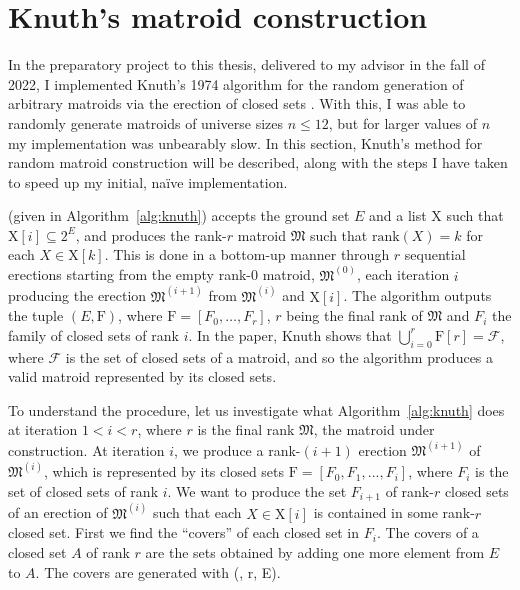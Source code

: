 \section{Knuth's matroid construction}
\label{sec:kmc}
In the preparatory project to this thesis, delivered to my advisor in the fall of 2022, I implemented Knuth's 1974 algorithm for the random generation of arbitrary matroids via the erection of closed sets \cite{knuth-1975}. With this, I was able to randomly generate matroids of universe sizes $n \leq 12$, but for larger values of $n$ my implementation was unbearably slow. In this section, Knuth's method for random matroid construction will be described, along with the steps I have taken to speed up my initial, naïve implementation.

 (given in Algorithm~\ref{alg:knuth}) accepts the ground set $E$ and a list $\mathrm{X}$ such that $\mathrm{X}[i] \subseteq 2^E$, and produces the rank-$r$ matroid $\mathfrak{M}$ such that $\mbox{rank}(X) = k$ for each $X \in \mathrm{X}[k]$. This is done in a bottom-up manner through $r$ sequential erections starting from the empty rank-0 matroid, $\mathfrak{M}^{(0)}$, each iteration $i$ producing the erection $\mathfrak{M}^{(i+1)}$ from $\mathfrak{M}^{(i)}$ and $\mathrm{X}[i]$. The algorithm outputs the tuple $(E, \mathrm{F})$, where $\mathrm{F} = [F_0, \ldots, F_r]$, $r$ being the final rank of $\mathfrak{M}$ and $F_i$ the family of closed sets of rank $i$. In the paper, Knuth shows that $\bigcup_{i=0}^r \mathrm{F}[r] = \mathcal{F}$, where $\mathcal{F}$ is the set of closed sets of a matroid, and so the algorithm produces a valid matroid represented by its closed sets.

To understand the procedure, let us investigate what Algorithm~\ref{alg:knuth} does at iteration $1<i<r$, where $r$ is the final rank $\mathfrak{M}$, the matroid under construction. At iteration $i$, we produce a rank-$(i+1)$ erection $\mathfrak{M}^{(i+1)}$ of $\mathfrak{M}^{(i)}$, which is represented by its closed sets $\mathrm{F} = [F_0, F_1, ..., F_i]$, where $F_i$ is the set of closed sets of rank $i$. We want to produce the set $F_{i+1}$ of rank-$r$ closed sets of an erection of $\mathfrak{M}^{(i)}$ such that each $X \in \mathrm{X}[i]$ is contained in some rank-$r$ closed set. First we find the ``covers'' of each closed set in $F_i$. The covers of a closed set $A$ of rank $r$ are the sets obtained by adding one more element from $E$ to $A$. The covers are generated with (, r, E).

